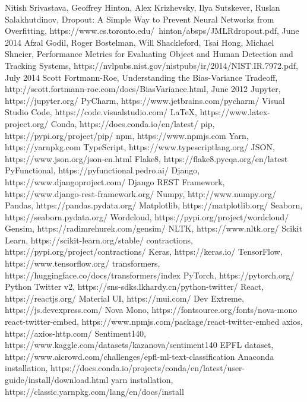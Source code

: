 \documentclass{article}
\begin{document}
\begin{thebibliography}{10}
  Nitish Srivastava, Geoffrey Hinton, Alex Krizhevsky, Ilya Sutskever, Ruslan Salakhutdinov, Dropout: A Simple Way to Prevent Neural Networks from Overfitting, https://www.cs.toronto.edu/~hinton/absps/JMLRdropout.pdf, June 2014
  Afzal Godil, Roger Bostelman, Will Shackleford, Tsai Hong, Michael Shneier, Performance Metrics for Evaluating Object and Human Detection and Tracking Systems, https://nvlpubs.nist.gov/nistpubs/ir/2014/NIST.IR.7972.pdf, July 2014
  Scott Fortmann-Roe, Understanding the Bias-Variance Tradeoff, http://scott.fortmann-roe.com/docs/BiasVariance.html, June 2012
  Jupyter, https://jupyter.org/
  PyCharm, https://www.jetbrains.com/pycharm/
  Visual Studio Code, https://code.visualstudio.com/
  LaTeX, https://www.latex-project.org/
  Conda, https://docs.conda.io/en/latest/
  pip, https://pypi.org/project/pip/
  npm, https://www.npmjs.com
  Yarn, https://yarnpkg.com
  TypeScript, https://www.typescriptlang.org/
  JSON, https://www.json.org/json-en.html
  Flake8, https://flake8.pycqa.org/en/latest
  PyFunctional, https://pyfunctional.pedro.ai/
  Django, https://www.djangoproject.com/
  Django REST Framework, https://www.django-rest-framework.org/
  Numpy, http://www.numpy.org/
  Pandas, https://pandas.pydata.org/
  Matplotlib, https://matplotlib.org/
  Seaborn, https://seaborn.pydata.org/
  Wordcloud, https://pypi.org/project/wordcloud/
  Gensim, https://radimrehurek.com/gensim/
  NLTK, https://www.nltk.org/
  Scikit Learn, https://scikit-learn.org/stable/
  contractions, https://pypi.org/project/contractions/
  Keras, https://keras.io/
  TensorFlow, https://www.tensorflow.org/
  transformers, https://huggingface.co/docs/transformers/index
  PyTorch, https://pytorch.org/
  Python Twitter v2, https://sns-sdks.lkhardy.cn/python-twitter/
  React, https://reactjs.org/
  Material UI, https://mui.com/
  Dev Extreme, https://js.devexpress.com/
  Nova Mono, https://fontsource.org/fonts/nova-mono
  react-twitter-embed, https://www.npmjs.com/package/react-twitter-embed
  axios, https://axios-http.com/
  Sentiment140, https://www.kaggle.com/datasets/kazanova/sentiment140
  EPFL dataset, https://www.aicrowd.com/challenges/epfl-ml-text-classification
  Anaconda installation, https://docs.conda.io/projects/conda/en/latest/user-guide/install/download.html
  yarn installation, https://classic.yarnpkg.com/lang/en/docs/install
\end{thebibliography}
\end{document}
